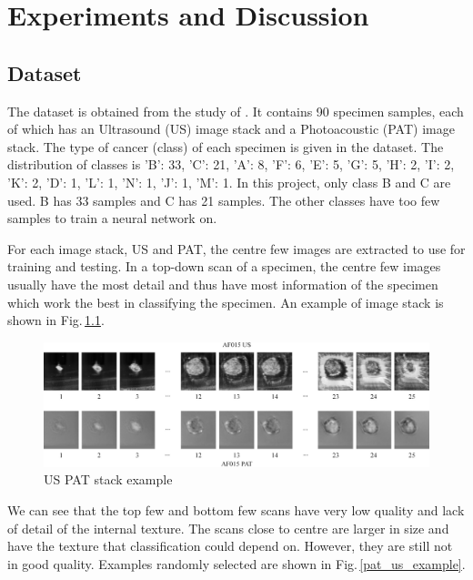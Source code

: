 \chapter{Experiments and Discussion} 

\section{Dataset}
The dataset is obtained from the study of \cite{Kosik2019}. It contains 90 specimen samples, each of which has an Ultrasound (US) image stack and a Photoacoustic (PAT) image stack. The type of cancer (class) of each specimen is given in the dataset. The distribution of classes is 
{'B': 33, 'C': 21, 'A': 8, 'F': 6, 'E': 5, 'G': 5, 'H': 2, 'I': 2, 'K': 2, 'D': 1, 'L': 1, 'N': 1, 'J': 1, 'M': 1}.  
In this project, only class B and C are used. B has 33 samples and C has 21 samples. The other classes have too few samples to train a neural network on. 

For each image stack, US and PAT, the centre few images are extracted to use for training and testing. In a top-down scan of a specimen, the centre few images usually have the most detail and thus have most information of the specimen which work the best in classifying the specimen. An example of image stack is shown in Fig.\,\ref{stack}. 

\begin{figure}[h]
	\centering
	\includegraphics[width=\textwidth]{Figs/stack.jpg}
    \caption{US PAT stack example}
    \label{stack}
\end{figure}

We can see that the top few and bottom few scans have very low quality and lack of detail of the internal texture. The scans close to centre are larger in size and have the texture that classification could depend on. However, they are still not in good quality. Examples randomly selected are shown in Fig.\,\ref{pat_us_example}.

